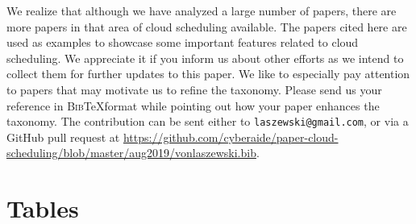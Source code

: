 \documentclass[final,5p,times,twocolumn]{elsarticle}
\begin{document}
We realize that although we have analyzed a large number of papers, there are more papers in that area of cloud scheduling available. The papers cited here are used as examples to showcase some important features related to cloud scheduling. We appreciate it if you inform us about other efforts as we intend to collect them for further updates to this paper. We like to especially pay attention to papers that may motivate us to refine the taxonomy. Please send us your reference in \textsc{Bib}\TeX format while pointing out how your paper enhances the taxonomy. The contribution can be sent either to \verb|laszewski@gmail.com|, or via a GitHub pull request at \url{https://github.com/cyberaide/paper-cloud-scheduling/blob/master/aug2019/vonlaszewski.bib}.


%




\appendix

\section{Tables}
















\clearpage


\end{document}
